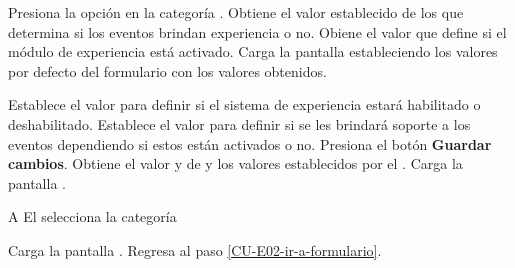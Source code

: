 \begin{UCtrayectoria}%
%
   

  \Actor Presiona la opción {\bf {}} en la categoría
         .  \label{CU-E02-ir-a-formulario}
  \Sistema Obtiene el valor establecido de los  que determina si los eventos brindan
           experiencia o no. \label{CU-E03-formulario}
  \Sistema Obiene el valor  que define si el
           módulo de experiencia está activado.
  \Sistema Carga la pantalla  estableciendo los valores por defecto del
           formulario con los valores obtenidos.

  \Actor Establece el valor  para definir si
         el sistema de experiencia estará habilitado o deshabilitado. 
  \Actor Establece el valor 
         para definir si se les brindará soporte a los eventos dependiendo si estos
         están activados o no.
  \Actor Presiona el botón {\bf Guardar cambios}.
  \Sistema Obtiene el valor  y de
            y los valores
           establecidos por el .
  \Sistema Carga la pantalla .

\end{UCtrayectoria}

\begin{UCtrayectoriaA}{A}{%
El  selecciona la categoría }

    \Sistema Carga la pantalla .
    \Sistema Regresa al paso \ref{CU-E02-ir-a-formulario}.
\end{UCtrayectoriaA}

